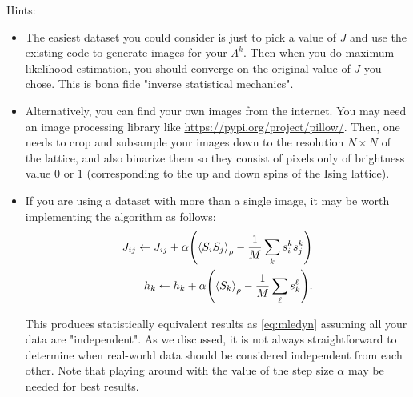 \documentclass[11pt]{article}
\begin{document}
Hints:
\begin{itemize}
\item The easiest dataset you could consider is just to pick a value of \(J\) and use the existing code to generate images for your \(\Lambda^{k}\). Then when you do maximum likelihood estimation, you should converge on the original value of \(J\) you chose. This is bona fide "inverse statistical mechanics".
\item Alternatively, you can find your own images from the internet. You may need an image processing library like \url{https://pypi.org/project/pillow/}. Then, one needs to crop and subsample your images down to the resolution \(N \times N\) of the lattice, and also binarize them so they consist of pixels only of brightness value \(0\) or \(1\) (corresponding to the up and down spins of the Ising lattice).
\item If you are using a dataset with more than a single image, it may be worth implementing the algorithm as follows:
\begin{align*}
J_{ij} \leftarrow J_{ij} + \alpha \qty(\ev{S_{i}S_{j}}_{\rho} - \frac{1}{M} \sum_{k} s^{k}_{i}s^{k}_{j}) \\
h_{k} \leftarrow h_{k} + \alpha \qty(\ev{S_{k}}_{\rho} - \frac{1}{M} \sum_{\ell} s^{\ell}_{k}).
\end{align*}

This produces statistically equivalent results as \eqref{eq:mledyn} assuming all your data are "independent". As we discussed, it is not always straightforward to determine when real-world data should be considered independent from each other. Note that playing around with the value of the step size \(\alpha\) may be needed for best results.
\end{itemize}
\end{document}
